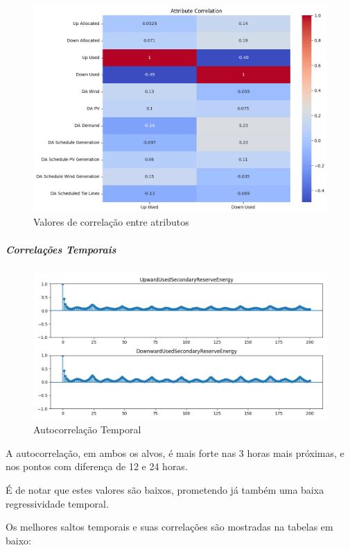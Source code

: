 \begin{figure}[H]
  \centering
  \includegraphics[width=\textwidth]{plots/correlation_heatmap.png}
  \caption{Valores de correlação entre atributos}
  \label{fig:correlationheatmap}
\end{figure}

\subparagraph{Correlações Temporais}
\text{ }  \par

\begin{figure}[H]
  \centering
  \includegraphics[width=\textwidth]{plots/autocorrelation.png}
  \caption{Autocorrelação Temporal}
  \label{fig:autocorrelation}
\end{figure}

A autocorrelação, em ambos os alvos, é mais forte nas 3 horas mais próximas, e nos pontos com diferença de 12 e 24 horas.\par
É de notar que estes valores são baixos, prometendo já também uma baixa regressividade temporal.\par
Os melhores saltos temporais e suas correlações são mostradas na tabelas em baixo:\\


